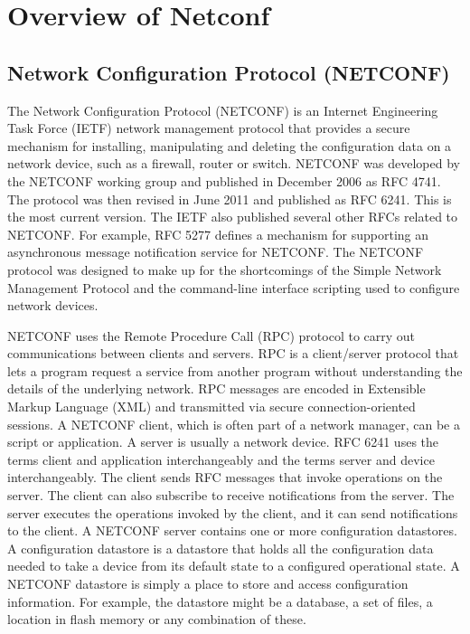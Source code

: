 \chapter{Overview of Netconf}

\section{Network Configuration Protocol (NETCONF)}

The Network Configuration Protocol (NETCONF) is an Internet Engineering Task Force (IETF) network management protocol that provides a secure mechanism for installing, manipulating and deleting the configuration data on a network device, such as a firewall, router or switch.
NETCONF was developed by the NETCONF working group and published in December 2006 as RFC 4741. The protocol was then revised in June 2011 and published as RFC 6241. This is the most current version. The IETF also published several other RFCs related to NETCONF. For example, RFC 5277 defines a mechanism for supporting an asynchronous message notification service for NETCONF.
The NETCONF protocol was designed to make up for the shortcomings of the Simple Network Management Protocol and the command-line interface scripting used to configure network devices.

NETCONF uses the Remote Procedure Call (RPC) protocol to carry out communications between clients and servers. RPC is a client/server protocol that lets a program request a service from another program without understanding the details of the underlying network. RPC messages are encoded in Extensible Markup Language (XML) and transmitted via secure connection-oriented sessions.
A NETCONF client, which is often part of a network manager, can be a script or application. A server is usually a network device. RFC 6241 uses the terms client and application interchangeably and the terms server and device interchangeably.
The client sends RFC messages that invoke operations on the server. The client can also subscribe to receive notifications from the server. The server executes the operations invoked by the client, and it can send notifications to the client.
A NETCONF server contains one or more configuration datastores. A configuration datastore is a datastore that holds all the configuration data needed to take a device from its default state to a configured operational state. A NETCONF datastore is simply a place to store and access configuration information. For example, the datastore might be a database, a set of files, a location in flash memory or any combination of these.

